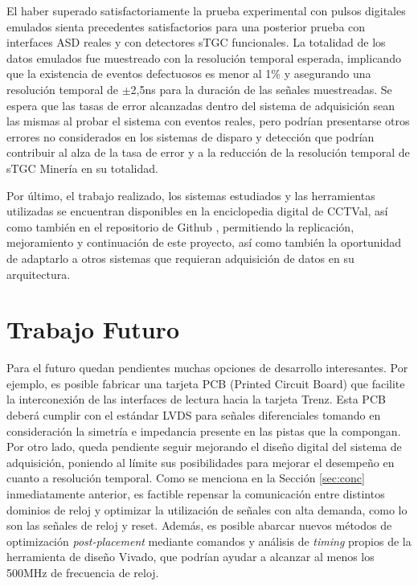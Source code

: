 El haber superado satisfactoriamente la prueba experimental con pulsos digitales emulados sienta precedentes satisfactorios para una posterior prueba con interfaces ASD reales y con detectores sTGC funcionales. La totalidad %
de los datos emulados fue muestreado con la resolución temporal esperada, implicando que la existencia de eventos defectuosos es menor al 1\% y asegurando una resolución temporal de $\pm$2,5ns para la duración de las señales muestreadas. Se espera que las tasas de error alcanzadas dentro del sistema de adquisición sean las mismas al probar el sistema con eventos reales, pero podrían presentarse otros errores no considerados en los sistemas de disparo y detección que podrían contribuir al alza de la tasa de error y a la reducción de la resolución temporal de sTGC Minería en su totalidad.


Por último, el trabajo realizado, los sistemas estudiados y las herramientas utilizadas se encuentran disponibles en la enciclopedia digital de CCTVal, así como también en el repositorio de Github \cite{GonzalezMuonRepository}, permitiendo la replicación, mejoramiento y continuación de este proyecto, así como también la oportunidad de adaptarlo a otros sistemas que requieran adquisición de datos en su arquitectura.


\section{Trabajo Futuro}

Para el futuro quedan pendientes muchas opciones de desarrollo interesantes. Por ejemplo, es posible fabricar una tarjeta PCB (Printed Circuit Board) que facilite la interconexión de las interfaces de lectura hacia la tarjeta Trenz. Esta PCB deberá cumplir con el estándar LVDS para señales diferenciales tomando en consideración la simetría e impedancia presente en las pistas que la compongan. Por otro lado, queda pendiente seguir mejorando el diseño digital del sistema de adquisición, poniendo al límite sus posibilidades para mejorar el desempeño en cuanto a resolución temporal. Como se menciona en la Sección \ref{sec:conc} inmediatamente anterior, es factible repensar la comunicación entre distintos dominios de reloj y optimizar la utilización de señales con alta demanda, como lo son las señales de reloj y reset. Además, es posible abarcar nuevos métodos de optimización \textit{post-placement} mediante comandos y análisis de \textit{timing}\cite{XilinxUltraFastGuide} propios de la herramienta de diseño Vivado, que podrían ayudar a alcanzar al menos los 500MHz de frecuencia de reloj.

